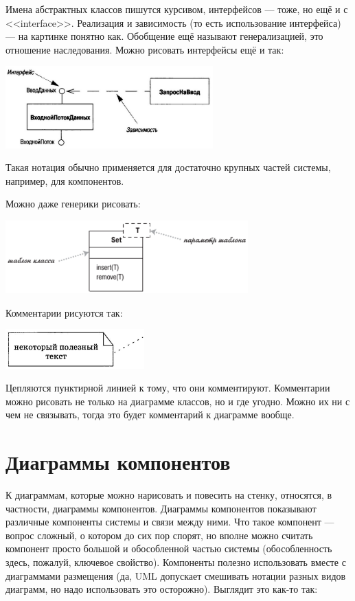 \documentclass{../../text-style}
\begin{document}
Имена абстрактных классов пишутся курсивом, интерфейсов --- тоже, но ещё и с <<interface>>. Реализация и зависимость (то есть использование интерфейса) --- на картинке понятно как. Обобщение ещё называют генерализацией, это отношение наследования. Можно рисовать интерфейсы ещё и так:

\begin{center}
    \includegraphics[width=0.6\textwidth]{interfaces2.png}
\end{center}

Такая нотация обычно применяется для достаточно крупных частей системы, например, для компонентов.

Можно даже генерики рисовать:

\begin{center}
    \includegraphics[width=0.7\textwidth]{templates.png}
\end{center}

Комментарии рисуются так:

\begin{center}
    \includegraphics[width=0.4\textwidth]{comment.png}
\end{center}

Цепляются пунктирной линией к тому, что они комментируют. Комментарии можно рисовать не только на диаграмме классов, но и где угодно. Можно их ни с чем не связывать, тогда это будет комментарий к диаграмме вообще.

\section{Диаграммы компонентов}

К диаграммам, которые можно нарисовать и повесить на стенку, относятся, в частности, диаграммы компонентов. Диаграммы компонентов показывают различные компоненты системы и связи между ними. Что такое компонент --- вопрос сложный, о котором до сих пор спорят, но вполне можно считать компонент просто большой и обособленной частью системы (обособленность здесь, пожалуй, ключевое свойство). Компоненты полезно использовать вместе с диаграммами размещения (да, UML допускает смешивать нотации разных видов диаграмм, но надо использовать это осторожно). Выглядит это как-то так:
\end{document}
